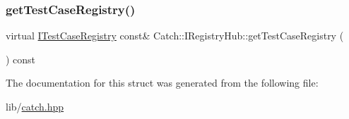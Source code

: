 \hypertarget{struct_catch_1_1_i_registry_hub_af4f6255f0c0f8f1f179fa9d7d4843076}{}\label{struct_catch_1_1_i_registry_hub_af4f6255f0c0f8f1f179fa9d7d4843076} 
\subsubsection{\texorpdfstring{get\+Test\+Case\+Registry()}{getTestCaseRegistry()}}
{\footnotesize\ttfamily virtual \hyperlink{struct_catch_1_1_i_test_case_registry}{I\+Test\+Case\+Registry} const\& Catch\+::\+I\+Registry\+Hub\+::get\+Test\+Case\+Registry (\begin{DoxyParamCaption}{ }\end{DoxyParamCaption}) const\hspace{0.3cm}{\ttfamily [pure virtual]}}



The documentation for this struct was generated from the following file\+:\begin{DoxyCompactItemize}
\item 
lib/\hyperlink{catch_8hpp}{catch.\+hpp}\end{DoxyCompactItemize}
